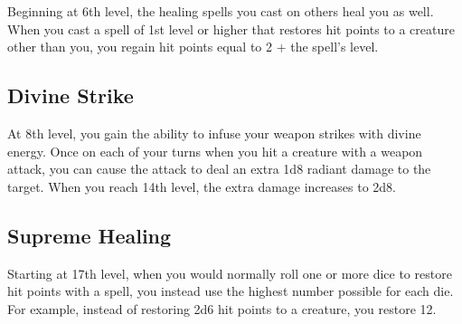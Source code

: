 Beginning at 6th level, the healing spells you cast on others heal you as well. When you cast a spell of 1st level or higher that restores hit points to a creature other than you, you regain hit points equal to 2 + the spell's level.

\subsection{Divine Strike}

At 8th level, you gain the ability to infuse your weapon strikes with divine energy. Once on each of your turns when you hit a creature with a weapon attack, you can cause the attack to deal an extra 1d8 radiant damage to the target. When you reach 14th level, the extra damage increases to 2d8.

\subsection{Supreme Healing}

Starting at 17th level, when you would normally roll one or more dice to restore hit points with a spell, you instead use the highest number possible for each die. For example, instead of restoring 2d6 hit points to a creature, you restore 12.